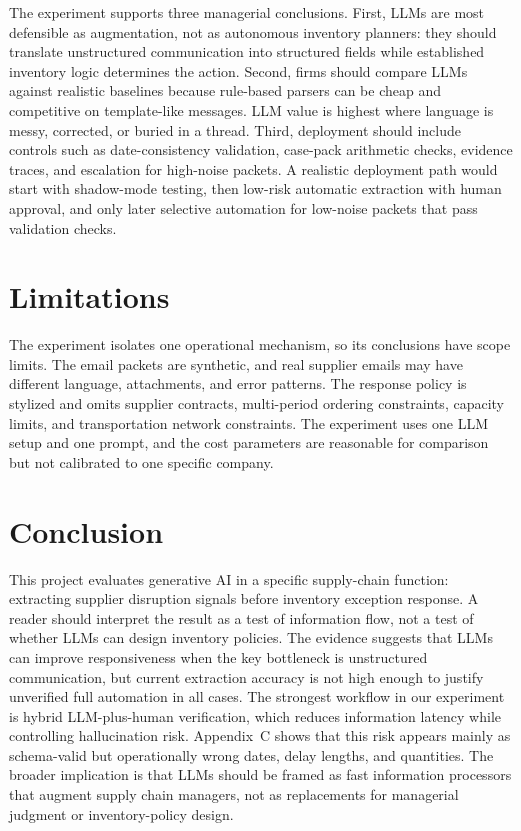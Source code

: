 \documentclass[11pt]{article}
\begin{document}
The experiment supports three managerial conclusions. First, LLMs are most defensible as augmentation, not as autonomous inventory planners: they should translate unstructured communication into structured fields while established inventory logic determines the action. Second, firms should compare LLMs against realistic baselines because rule-based parsers can be cheap and competitive on template-like messages. LLM value is highest where language is messy, corrected, or buried in a thread. Third, deployment should include controls such as date-consistency validation, case-pack arithmetic checks, evidence traces, and escalation for high-noise packets. A realistic deployment path would start with shadow-mode testing, then low-risk automatic extraction with human approval, and only later selective automation for low-noise packets that pass validation checks.

\section{Limitations}

The experiment isolates one operational mechanism, so its conclusions have scope limits. The email packets are synthetic, and real supplier emails may have different language, attachments, and error patterns. The response policy is stylized and omits supplier contracts, multi-period ordering constraints, capacity limits, and transportation network constraints. The experiment uses one LLM setup and one prompt, and the cost parameters are reasonable for comparison but not calibrated to one specific company.

\section{Conclusion}

This project evaluates generative AI in a specific supply-chain function: extracting supplier disruption signals before inventory exception response. A reader should interpret the result as a test of information flow, not a test of whether LLMs can design inventory policies. The evidence suggests that LLMs can improve responsiveness when the key bottleneck is unstructured communication, but current extraction accuracy is not high enough to justify unverified full automation in all cases. The strongest workflow in our experiment is hybrid LLM-plus-human verification, which reduces information latency while controlling hallucination risk. Appendix~C shows that this risk appears mainly as schema-valid but operationally wrong dates, delay lengths, and quantities. The broader implication is that LLMs should be framed as fast information processors that augment supply chain managers, not as replacements for managerial judgment or inventory-policy design.
\end{document}
